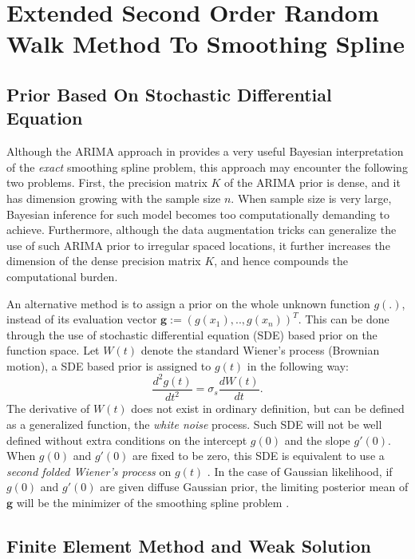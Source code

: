\documentclass{article}
\begin{document}
\section{Extended Second Order Random Walk Method To Smoothing Spline}\label{rw2}

\subsection{Prior Based On Stochastic Differential Equation}\label{SDEprior}


Although the ARIMA approach in \cite{ARIMA} provides a very useful Bayesian interpretation of the \textit{exact} smoothing spline problem, this approach may encounter the following two problems.
First, the precision matrix $K$ of the ARIMA prior is dense, and it has dimension growing with the sample size $n$. When sample size is very large, Bayesian inference for such model becomes too computationally demanding to achieve.
Furthermore, although the data augmentation tricks can generalize the use of such ARIMA prior to irregular spaced locations, it further increases the dimension of the dense precision matrix $K$, and hence compounds the computational burden.

An alternative method is to assign a prior on the whole unknown function $g(.)$, instead of its evaluation vector $\boldsymbol g :=(g(x_1),..,g(x_n))^T$. This can be done through the use of stochastic differential equation (SDE) based prior on the function space. Let $W(t)$ denote the standard Wiener's process (Brownian motion), a SDE based prior is assigned to $g(t)$ in the following way:
$$\frac{d^2g(t)}{dt^2} = \sigma_s\frac{dW(t)}{dt}.$$ 
The derivative of $W(t)$ does not exist in ordinary definition, but can be defined as a generalized function, the \textit{white noise} process. Such SDE will not be well defined without extra conditions on the intercept $g(0)$ and the 
slope $g'(0)$. When $g(0)$ and $g'(0)$ are fixed to be zero, this SDE is equivalent to use a \textit{second folded Wiener's process} on $g(t)$ \citep{shepp1966radon}. In the case of Gaussian likelihood, if $g(0)$ and $g'(0)$ are given diffuse Gaussian prior, the limiting posterior mean of $\boldsymbol g$ will be the minimizer of the smoothing spline problem \citep{wahba}.


\subsection{Finite Element Method and Weak Solution}
\end{document}
